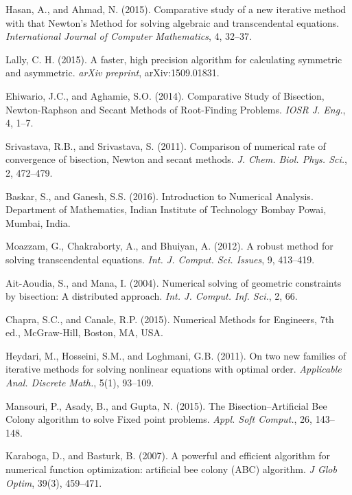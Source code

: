 \documentclass[amsmath, amssymb, aps]{revtex4-2}
\begin{document}
\begin{thebibliography}{99}
Hasan, A., and Ahmad, N. (2015). Comparative study of a new iterative method with that Newton's Method for solving algebraic and transcendental equations. \textit{International Journal of Computer Mathematics}, 4, 32--37.

Lally, C. H. (2015). A faster, high precision algorithm for calculating symmetric and asymmetric. \textit{arXiv preprint}, arXiv:1509.01831.

Ehiwario, J.C., and Aghamie, S.O. (2014). Comparative Study of Bisection, Newton-Raphson and Secant Methods of Root-Finding Problems. \textit{IOSR J. Eng.}, 4, 1--7.

Srivastava, R.B., and Srivastava, S. (2011). Comparison of numerical rate of convergence of bisection, Newton and secant methods. \textit{J. Chem. Biol. Phys. Sci.}, 2, 472--479.

Baskar, S., and Ganesh, S.S. (2016). Introduction to Numerical Analysis. Department of Mathematics, Indian Institute of Technology Bombay Powai, Mumbai, India.

Moazzam, G., Chakraborty, A., and Bhuiyan, A. (2012). A robust method for solving transcendental equations. \textit{Int. J. Comput. Sci. Issues}, 9, 413--419.

Ait-Aoudia, S., and Mana, I. (2004). Numerical solving of geometric constraints by bisection: A distributed approach. \textit{Int. J. Comput. Inf. Sci.}, 2, 66.

Chapra, S.C., and Canale, R.P. (2015). Numerical Methods for Engineers, 7th ed., McGraw-Hill, Boston, MA, USA.

Heydari, M., Hosseini, S.M., and Loghmani, G.B. (2011). On two new families of iterative methods for solving nonlinear equations with optimal order. \textit{Applicable Anal. Discrete Math.}, 5(1), 93--109.

Mansouri, P., Asady, B., and Gupta, N. (2015). The Bisection--Artificial Bee Colony algorithm to solve Fixed point problems. \textit{Appl. Soft Comput.}, 26, 143--148.

Karaboga, D., and Basturk, B. (2007). A powerful and efficient algorithm for numerical function optimization: artificial bee colony (ABC) algorithm. \textit{J Glob Optim}, 39(3), 459--471.


\end{thebibliography}
\end{document}
